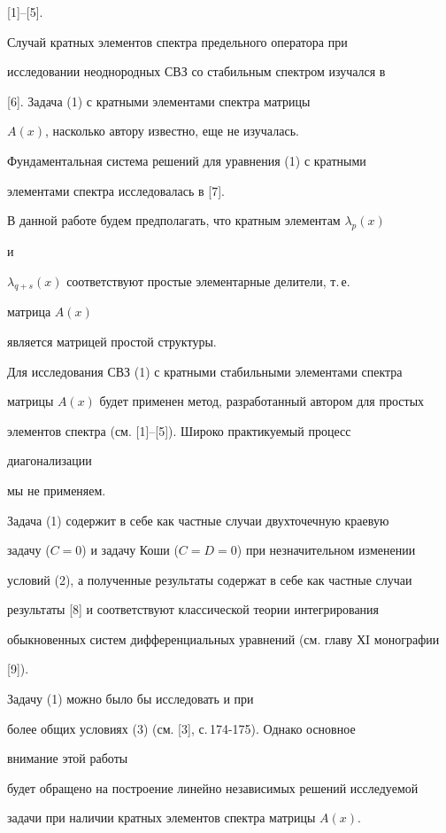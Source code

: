 [1]--[5]. 


Случай кратных элементов спектра предельного оператора при 


исследовании неоднородных СВЗ со стабильным спектром изучался в


[6]. Задача (1) с кратными элементами спектра матрицы 


$A(x)$, насколько автору известно, еще не изучалась. 


Фундаментальная система решений для уравнения (1) с кратными 


элементами спектра исследовалась в [7]. 


 


В данной работе будем предполагать, что кратным элементам $\lambda_p(x)$ 


и 


$\lambda_{q+s}(x)$ соответствуют простые элементарные делители, т.\,е. 


матрица $A(x)$ 


является матрицей простой структуры. 


Для исследования СВЗ (1) с кратными стабильными элементами спектра 


матрицы $A(x)$ будет применен метод, разработанный автором для простых 


элементов спектра (см. [1]--[5]). Широко практикуемый процесс 


диагонализации 


мы не применяем. 


Задача (1) содержит в себе как частные случаи двухточечную краевую 


задачу ($C=0$) и задачу Коши ($C=D=0$) при незначительном изменении 


условий (2), а полученные результаты содержат в себе как частные случаи 


результаты [8] и соответствуют классической теории интегрирования 


обыкновенных систем дифференциальных уравнений (см. главу ХI монографии 


[9]). 


 


\begin{notenonum} Задачу (1) можно было бы исследовать и при 


более общих условиях (3) (см. [3], с.\,174-175). Однако основное 


внимание этой работы 


будет обращено на построение линейно независимых решений исследуемой 


задачи при наличии кратных элементов спектра матрицы $A(x)$. 


\end{notenonum} 


